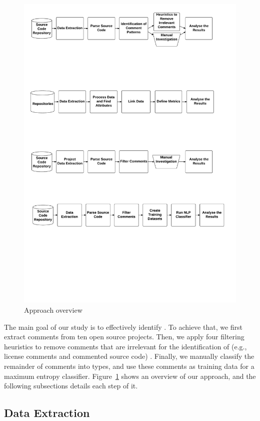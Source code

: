 \begin{figure}[thb!]
  \centering
  \includegraphics[width=1\textwidth]{figures/approach.pdf}
  \caption{Approach overview}
  \label{fig:approach}
\end{figure}

The main goal of our study is to effectively identify \SATD. To achieve that, we first extract comments from ten open source projects. Then, we apply four filtering heuristics to remove comments that are irrelevant for the identification of \SATD  (e.g., license comments and commented source code) \cite{Maldonado2015MTD}. Finally, we manually classify the remainder of comments into \SATD types, and use these comments as training data for a maximum entropy classifier. Figure~\ref{fig:approach} shows an overview of our approach, and the following subsections details each step of it.
   
\subsection{Data Extraction} %
\label{sub:data_extraction}

